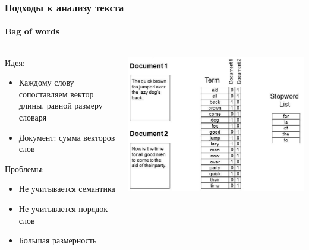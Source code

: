 \documentclass[10pt]{beamer}
\begin{document}
\begin{frame}
\frametitle{Подходы к анализу текста}
\framesubtitle{Bag of words}

\begin{columns}
    \begin{column}{0.5\textwidth}
    	Идея:
    	\begin{itemize}
        	\item Каждому слову сопоставляем вектор длины, равной размеру словаря
        	\item Документ: сумма векторов слов
        \end{itemize}
    	Проблемы:
    	\begin{itemize}
        	\item Не учитывается семантика
        	\item Не учитывается порядок слов
        	\item Большая размерность
        \end{itemize}
    \end{column}
    \begin{column}{0.5\textwidth}
        \begin{center}
            \includegraphics[width=1\textwidth]{images/bag_of_words.jpg} 
        \end{center}
    \end{column}
\end{columns}
\end{frame}

\end{document}
